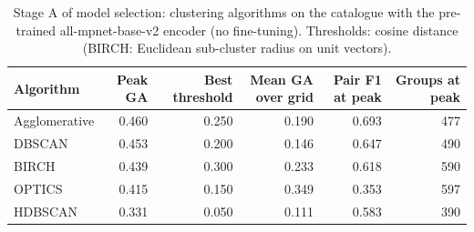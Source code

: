\begin{table}[t]
\centering
\caption{Stage A of model selection: clustering algorithms on the catalogue with the pre-trained all-mpnet-base-v2 encoder (no fine-tuning). Thresholds: cosine distance (BIRCH: Euclidean sub-cluster radius on unit vectors).}
\label{tab:selection_algorithms}
\small
\begin{tabular}{lrrrrr}
\toprule
Algorithm & Peak GA & Best threshold & Mean GA over grid & Pair F1 at peak & Groups at peak \\
\midrule
Agglomerative & 0.460 & 0.250 & 0.190 & 0.693 & 477 \\
DBSCAN & 0.453 & 0.200 & 0.146 & 0.647 & 490 \\
BIRCH & 0.439 & 0.300 & 0.233 & 0.618 & 590 \\
OPTICS & 0.415 & 0.150 & 0.349 & 0.353 & 597 \\
HDBSCAN & 0.331 & 0.050 & 0.111 & 0.583 & 390 \\
\bottomrule
\end{tabular}
\end{table}